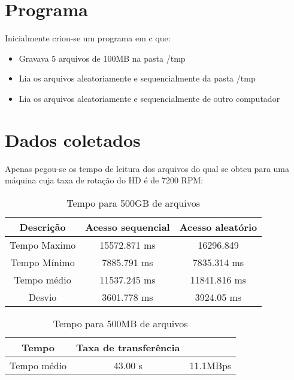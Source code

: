 \documentclass[11pt,a4paper]{article}
\begin{document}
\section{Programa}
Inicialmente criou-se um programa em c que:
\begin{itemize}
\item Gravava 5 arquivos de 100MB na pasta /tmp
\item Lia os arquivos aleatoriamente e sequencialmente da pasta /tmp

\item Lia os arquivos aleatoriamente e sequencialmente de outro computador 

\end{itemize}
\section{Dados coletados}
Apenas pegou-se os tempo de leitura dos arquivos do qual se obteu para
uma máquina cuja taxa de rotação do HD é de 7200 RPM:

\begin{table}[h!]
\caption{Tempo para 500GB de arquivos}
\begin{center}
\begin{tabular}{ccc}
\hline 
\hline
Descrição & Acesso sequencial & Acesso aleatório \\
\hline
Tempo Maximo & 15572.871 ms & 16296.849\\
Tempo Mínimo & 7885.791 ms & 7835.314 ms\\
Tempo médio & 11537.245 ms & 11841.816 ms\\
Desvio  & 3601.778 ms & 3924.05 ms \\

\end{tabular}
\end{center}
\end{table}

\begin{table}[h!]
\caption{Tempo para 500MB de arquivos}
\begin{center}
\begin{tabular}{ccc}
\hline 
\hline
 Tempo & Taxa de transferência \\
\hline
Tempo médio & 43.00 s & 11.1MBps\\

\end{tabular}
\end{center}
\end{table}
\end{document}
